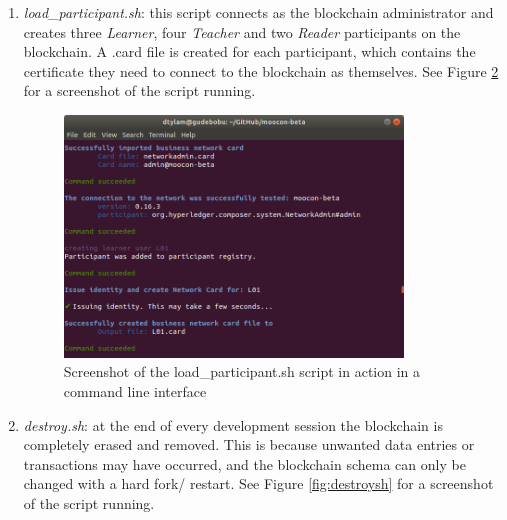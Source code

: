 \begin{enumerate}
\begin{figure}[!ht]
		      \label{fig:startsh}
	      \end{figure}
	\item \textit{load\_participant.sh}: this script connects as the blockchain administrator and creates
	      three \textit{Learner}, four \textit{Teacher} and two \textit{Reader} participants on the blockchain.
	      A .card file is created for each participant, which contains the certificate they need to
	      connect to the blockchain as themselves.
	      See Figure \ref{fig:load_participantsh} for a screenshot of the script running.
	      \begin{figure}[!ht]
		      \centering
		      \includegraphics[width=0.85\textwidth]{load_participantsh}
		      \caption[Participant Loading Script Screenshot]
		      {Screenshot of the load\_participant.sh script in action in a command line interface}
		      \label{fig:load_participantsh}
	      \end{figure}
	\item \textit{destroy.sh}: at the end of every development session the blockchain is completely
	      erased and removed. This is because unwanted data entries or transactions may have occurred, and
	      the blockchain schema can only be changed with a hard fork/ restart.
	      See Figure \ref{fig:destroysh} for a screenshot of the script running.


\end{enumerate}

